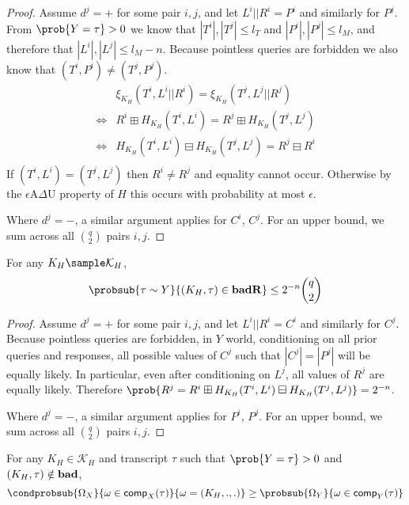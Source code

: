 \documentclass[eprint.tex]{subfiles}
\begin{document}
\begin{proof}
Assume $d^j = +$ for some pair $i, j$, and let $L^i || R^i = P^i$ and similarly for $P^j$.
From $\prob{Y = \tau} > 0$ we know that $|T^i|, |T^j| \leq l_T$ and $|P^i|, |P^j| \leq l_M$,
and therefore that $|L^i|, |L^j| \leq l_M - n$.
Because pointless queries are forbidden we also know that $(T^i, P^i) \neq (T^j, P^j)$.
%
\begin{align*}
    &\xi_{K_H}(T^i, L^i||R^i) = \xi_{K_H}(T^j, L^j||R^j) \\
    \Leftrightarrow& R^i \boxplus H_{K_H}(T^i, L^i) = R^j \boxplus H_{K_H}(T^j, L^j) \\
    \Leftrightarrow& H_{K_H}(T^i, L^i) \boxminus H_{K_H}(T^j, L^j) = R^j \boxminus R^i \\
\end{align*}
%
If $(T^i, L^i) = (T^j, L^j)$ then $R^i \neq R^j$ and equality cannot occur.
Otherwise by the $\epsilon$A$\Delta$U property of $H$ this occurs with probability
at most $\epsilon$.

Where $d^j = -$, a similar argument applies for $C^i$, $C^j$.
For an upper bound, we sum across all $\binom{q}{2}$ pairs $i, j$.
\end{proof}

\begin{lemma} \label{badR}
    For any $K_H \sample \mathcal{K}_H$,
    \begin{displaymath}
        \probsub{\tau \sim Y}{(K_H, \tau) \in \badR}
        \leq 2^{-n} \binom{q}{2}
    \end{displaymath}
\end{lemma}

\begin{proof}
    Assume $d^j = +$ for some pair $i, j$, and let $L^i || R^i = C^i$ and similarly for $C^j$.
    Because pointless queries are forbidden, in $Y$ world,
    conditioning on all prior queries and responses,
    all possible values of $C^j$ such that $|C^j| = |P^j|$ will be equally likely.
    In particular, even after conditioning on $L^j$,
    all values of $R^j$ are equally likely. Therefore
    $\prob{R^j = R^i \boxplus H_{K_H}(T^i, L^i) \boxminus H_{K_H}(T^j, L^j)} = 2^{-n}$.

    Where $d^j = -$, a similar argument applies for $P^i$, $P^j$.
    For an upper bound, we sum across all $\binom{q}{2}$ pairs $i, j$.
\end{proof}

\begin{lemma} \label{notbad}
    For any $K_H \in \mathcal{K}_H$ and transcript $\tau$ such that $\prob{Y = \tau} > 0$ and
    $(K_H, \tau) \notin \operatorname{\mathbf{bad}}$,
    \begin{displaymath}
        \condprobsub{\Omega_X}{\omega \in \comp_X(\tau)}{\omega = (K_H, ., .)}
        \geq
        \probsub{\Omega_Y}{\omega \in \comp_Y(\tau)}
    \end{displaymath}
\end{lemma}
\end{document}
